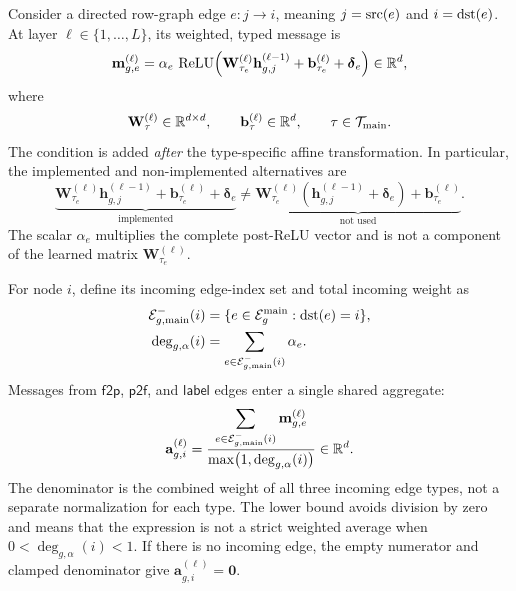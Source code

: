 Consider a directed row-graph edge
\(e:j\to i\), meaning
\(j=\operatorname{src}(e)\) and \(i=\operatorname{dst}(e)\). At layer
\(\ell\in\{1,\ldots,L\}\), its weighted, typed message is
\begin{equation}
  \mathbf m_{g,e}^{(\ell)}
  =
  \alpha_e\,
  \operatorname{ReLU}\!\left(
    \mathbf W_{\tau_e}^{(\ell)}
    \mathbf h_{g,j}^{(\ell-1)}
    +\mathbf b_{\tau_e}^{(\ell)}
    +\boldsymbol\delta_e
  \right)
  \in\mathbb{R}^d,
\label{eq:method:main-message}
\end{equation}
where
\begin{equation}
  \mathbf W_\tau^{(\ell)}\in\mathbb{R}^{d\times d},
  \qquad
  \mathbf b_\tau^{(\ell)}\in\mathbb{R}^d,
  \qquad
  \tau\in\mathcal T_{\mathrm{main}}.
\label{eq:method:main-edge-parameter-domains}
\end{equation}
The condition is added \emph{after} the type-specific affine transformation.
In particular, the implemented and non-implemented alternatives are
\begin{equation}
  \underbrace{
    \mathbf W_{\tau_e}^{(\ell)}\mathbf h_{g,j}^{(\ell-1)}
    +\mathbf b_{\tau_e}^{(\ell)}+\boldsymbol\delta_e
  }_{\text{implemented}}
  \ne
  \underbrace{
    \mathbf W_{\tau_e}^{(\ell)}
    (\mathbf h_{g,j}^{(\ell-1)}+\boldsymbol\delta_e)
    +\mathbf b_{\tau_e}^{(\ell)}
  }_{\text{not used}}.
\label{eq:method:condition-placement}
\end{equation}
The scalar \(\alpha_e\) multiplies the complete post-ReLU vector and is not
a component of the learned matrix \(\mathbf W_{\tau_e}^{(\ell)}\).

For node \(i\), define its incoming edge-index set and total incoming
weight as
\begin{equation}
\begin{aligned}
  \mathcal E_{g,\mathrm{main}}^{-}(i)
  &=
  \{e\in\mathcal E_g^{\mathrm{main}}:\operatorname{dst}(e)=i\},\\
  \deg_{g,\alpha}(i)
  &=
  \sum_{e\in\mathcal E_{g,\mathrm{main}}^{-}(i)}\alpha_e.
\end{aligned}
\label{eq:method:main-incoming-degree}
\end{equation}
Messages from \(\mathsf{f2p}\), \(\mathsf{p2f}\), and
\(\mathsf{label}\) edges enter a single shared aggregate:
\begin{equation}
  \mathbf a_{g,i}^{(\ell)}
  =
  \frac{
    \displaystyle
    \sum_{e\in\mathcal E_{g,\mathrm{main}}^{-}(i)}
    \mathbf m_{g,e}^{(\ell)}
  }{
    \displaystyle
    \max\!\left(1,\deg_{g,\alpha}(i)\right)
  }
  \in\mathbb{R}^d.
\label{eq:method:main-aggregation}
\end{equation}
The denominator is the combined weight of all three incoming edge types,
not a separate normalization for each type. The lower bound avoids division
by zero and means that the expression is not a strict weighted average when
\(0<\deg_{g,\alpha}(i)<1\). If there is no incoming edge, the empty numerator
and clamped denominator give \(\mathbf a_{g,i}^{(\ell)}=\mathbf0\).

